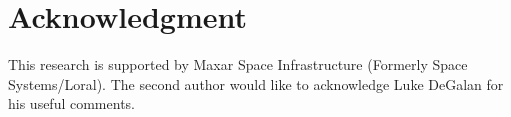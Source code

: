 \documentclass[journal ]{new-aiaa}
\begin{document}
	\section{Acknowledgment}
	This research is supported by Maxar Space Infrastructure (Formerly Space Systems/Loral). The second author would like to acknowledge Luke DeGalan for his useful comments.

	


	
	
	
	
\end{document}
